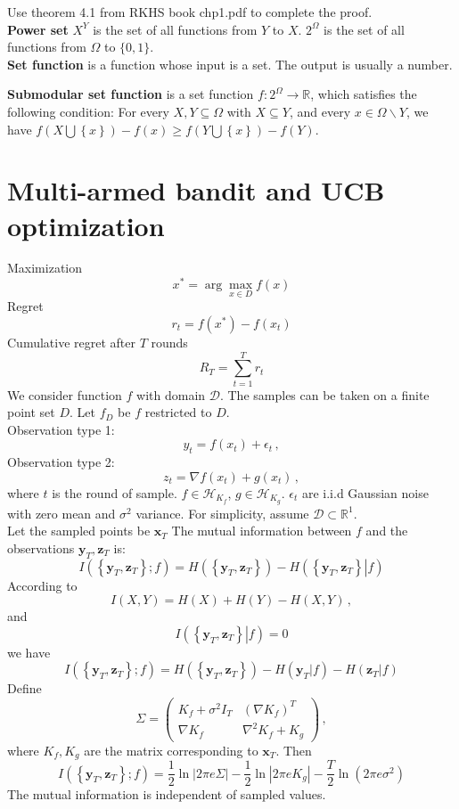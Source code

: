 \documentclass[a4paper,onecolumn]{article}
\begin{document}
Use theorem 4.1 from RKHS book chp1.pdf to complete the proof.\\

\textbf{Power set} $X^Y$ is the set of all functions from $Y$ to $X$. $2^\Omega$ is the set of all
functions from $\Omega$ to $\{0,1\}$.\\

\textbf{Set function} is a function whose input is a set. The output is usually a number.

\textbf{Submodular set function} is a set function $f: 2^\Omega\rightarrow \mathbb{R}$,
which satisfies the following condition:
For every $X, Y\subseteq \Omega$ with $X\subseteq Y$, and every $x\in\Omega \backslash Y$,
we have $f(X\bigcup \left\{x\right\}) -f(x) \ge f(Y\bigcup\left\{x\right\})-f(Y)$.

\section{Multi-armed bandit and UCB optimization}
Maximization
$$
x^* = \arg\max_{x\in D}f(x)
$$
Regret
$$
    r_t = f(x^*) - f(x_t)
$$
Cumulative regret after $T$ rounds
$$
    R_T = \sum_{t=1}^T r_t
$$
We consider function $f$ with domain $\mathcal{D}$. The samples can be taken on a finite point set $D$.
Let $f_D$ be $f$ restricted to $D$.\\
Observation type 1:
$$
    y_t = f(x_t) + \epsilon_t\,,
$$
Observation type 2:
$$
    z_t = \nabla f(x_t) + g(x_t)\,,
$$
where $t$ is the round of sample. $f\in \mathcal{H}_{K_f}$, $g\in \mathcal{H}_{K_g}$.
$\epsilon_t$ are i.i.d Gaussian noise with zero mean and $\sigma^2$ variance.
For simplicity, assume $\mathcal{D}\subset \mathbb{R}^1$.\\
Let the sampled points be $\textbf{x}_T$
The mutual information between $f$ and the observations $\textbf{y}_T, \textbf{z}_T$ is:
$$
I(\left\{\textbf{y}_T, \textbf{z}_T\right\}; f) = H(\left\{\textbf{y}_T, \textbf{z}_T\right\}) 
- H(\left\{\textbf{y}_T, \textbf{z}_T\right\}\left.\right| f)
$$
According to 
$$
    I(X,Y) = H(X) + H(Y) - H(X,Y)\,,
$$
and
$$
    I(\left\{\textbf{y}_T, \textbf{z}_T\right\}\left.\right| f) = 0
$$
we have
$$
    I(\left\{\textbf{y}_T, \textbf{z}_T\right\};f) = H(\left\{\textbf{y}_T, \textbf{z}_T\right\}) 
    - H(\textbf{y}_T|f) - H(\textbf{z}_T|f)
$$
Define 
\begin{equation*}
    \Sigma = \begin{pmatrix}
        K_f + \sigma^2 I_T & (\nabla K_f)^T\\
        \nabla K_f & \nabla^2 K_f + K_g
    \end{pmatrix}\,,
\end{equation*}
where $K_f, K_g$ are the matrix corresponding to $\textbf{x}_T$. Then
$$
    I(\left\{\textbf{y}_T, \textbf{z}_T\right\}; f)
    = \frac{1}{2}\ln \left| 2\pi e \Sigma \right| - \frac{1}{2} \ln \left| 2 \pi e K_g\right|
    - \frac{T}{2}\ln(2\pi e\sigma^2)
$$
The mutual information is independent of sampled values.\\
\end{document}
